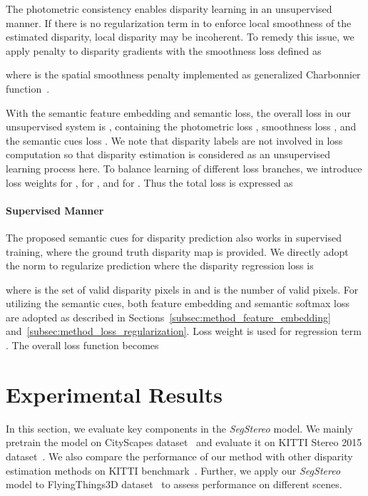 \documentclass[runningheads]{llncs}
\begin{document}
The photometric consistency enables disparity learning in an unsupervised manner. If there is no regularization term in  to enforce local smoothness of the estimated disparity, local disparity may be incoherent. To remedy this issue, we apply  penalty to disparity gradients  with the smoothness loss  defined as

where  is the spatial smoothness penalty implemented as generalized Charbonnier function~\cite{barron2017more}. 

With the semantic feature embedding and semantic loss, the overall loss in our unsupervised system is , containing the photometric loss , smoothness loss , and the semantic cues loss . We note that disparity labels are not involved in loss computation so that disparity estimation is considered as an unsupervised learning process here. To balance learning of different loss branches, we introduce loss weights  for ,  for , and  for . Thus the total loss  is expressed as


\paragraph{\textbf{Supervised Manner}}
The proposed semantic cues for disparity prediction also works in supervised training, where the ground truth disparity map  is provided. We directly adopt the  norm to regularize prediction where the disparity regression loss  is

where  is the set of valid disparity pixels in  and  is the number of valid pixels. For utilizing the semantic cues, both feature embedding and semantic softmax loss are adopted as described in Sections~\ref{subsec:method_feature_embedding} and~\ref{subsec:method_loss_regularization}. Loss weight  is used for regression term . The overall loss function  becomes


\section{Experimental Results}
In this section, we evaluate key components in the \emph{SegStereo} model. We mainly pretrain the model on CityScapes dataset~\cite{cordts2016cityscapes} and evaluate it on KITTI Stereo 2015 dataset~\cite{Menze2015CVPR}. We also compare the performance of our method with other disparity estimation methods on KITTI benchmark~\cite{Menze2015CVPR}. Further, we apply our \emph{SegStereo} model to FlyingThings3D dataset~\cite{mayer2016large} to assess performance on different scenes.
\end{document}
